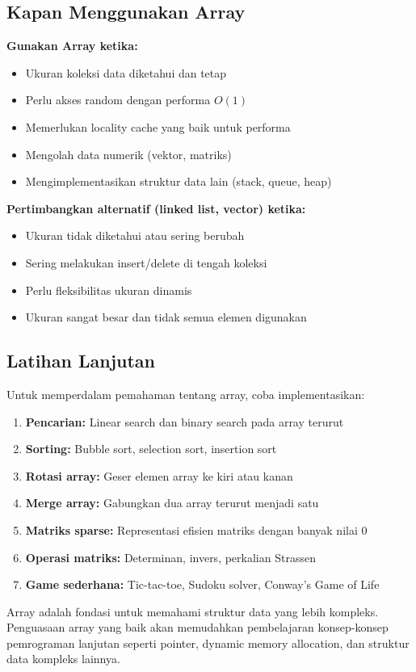 \documentclass[../main.tex]{subfiles}
\begin{document}
\subsection{Kapan Menggunakan Array}

\textbf{Gunakan Array ketika:}
\begin{itemize}
  \item Ukuran koleksi data diketahui dan tetap
  \item Perlu akses random dengan performa \(O(1)\)
  \item Memerlukan locality cache yang baik untuk performa
  \item Mengolah data numerik (vektor, matriks)
  \item Mengimplementasikan struktur data lain (stack, queue, heap)
\end{itemize}

\textbf{Pertimbangkan alternatif (linked list, vector) ketika:}
\begin{itemize}
  \item Ukuran tidak diketahui atau sering berubah
  \item Sering melakukan insert/delete di tengah koleksi
  \item Perlu fleksibilitas ukuran dinamis
  \item Ukuran sangat besar dan tidak semua elemen digunakan
\end{itemize}

\subsection{Latihan Lanjutan}

Untuk memperdalam pemahaman tentang array, coba implementasikan:
\begin{enumerate}
  \item \textbf{Pencarian:} Linear search dan binary search pada array terurut
  \item \textbf{Sorting:} Bubble sort, selection sort, insertion sort
  \item \textbf{Rotasi array:} Geser elemen array ke kiri atau kanan
  \item \textbf{Merge array:} Gabungkan dua array terurut menjadi satu
  \item \textbf{Matriks sparse:} Representasi efisien matriks dengan banyak nilai 0
  \item \textbf{Operasi matriks:} Determinan, invers, perkalian Strassen
  \item \textbf{Game sederhana:} Tic-tac-toe, Sudoku solver, Conway's Game of Life
\end{enumerate}

Array adalah fondasi untuk memahami struktur data yang lebih kompleks. Penguasaan array yang baik akan memudahkan pembelajaran konsep-konsep pemrograman lanjutan seperti pointer, dynamic memory allocation, dan struktur data kompleks lainnya.
\end{document}

